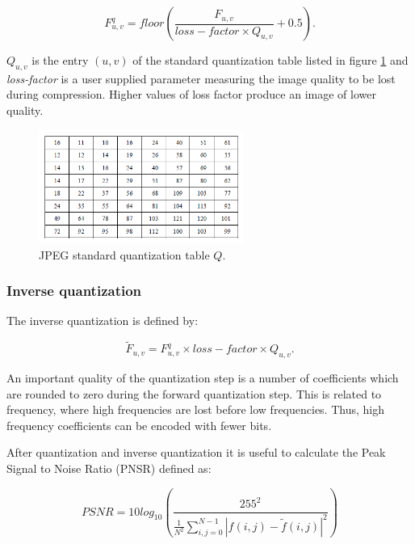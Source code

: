 \documentclass[11pt,a4paper]{article}
\begin{document}
\begin{equation}
F^q_{u,v} = floor \left( \frac{F_{u,v}}{loss-factor \times Q_{u,v}} + 0.5 \right).
\end{equation}

$Q_{u,v}$ is the entry $(u,v)$ of the standard quantization table listed in figure \ref{fig:Q} and \textit{loss-factor} is a user supplied parameter measuring the image quality to be lost during compression. Higher values of loss factor produce an image of lower quality.

\begin{figure}[ht]
\centering
\includegraphics[width=0.6\textwidth]{Q}
\caption{JPEG standard quantization table $Q$.}
\label{fig:Q}
\end{figure}

\subsubsection{Inverse quantization}
The inverse quantization is defined by:

\begin{equation}
\tilde{F}_{u,v} = F^q_{u,v} \times loss-factor \times Q_{u,v}.
\end{equation}

An important quality of the quantization step is a number of coefficients which are rounded to zero during the forward quantization step. This is related to frequency, where high frequencies are lost before low frequencies. Thus, high frequency coefficients can be encoded with fewer bits.

After quantization and inverse quantization it is useful to calculate the Peak Signal to Noise Ratio (PNSR) defined as:

\begin{equation}
PSNR = 10log_{10} \left( \frac{255^2}{\frac{1}{N^2} \sum_{i,j=0}^{N-1} |f(i,j) - \tilde{f}(i,j)|^2} \right)
\end{equation}

\clearpage
\end{document}
